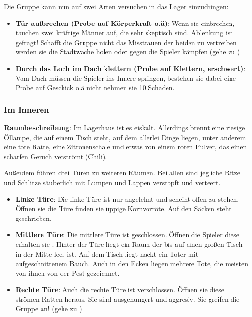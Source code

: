 Die Gruppe kann nun auf zwei Arten versuchen in das Lager einzudringen:

\begin{itemize}
  \item \textbf{Tür aufbrechen (Probe auf Körperkraft o.ä)}: Wenn sie einbrechen, tauchen zwei kräftige Männer auf, die sehr skeptisch sind. Ablenkung ist gefragt! Schafft die Gruppe nicht das Misstrauen der beiden zu vertreiben werden sie die Stadtwache holen oder gegen die Spieler kämpfen (gehe zu \blue{\ref{kampf2}})
  \item \textbf{Durch das Loch im Dach klettern (Probe auf Klettern, erschwert)}: Vom Dach müssen die Spieler ins Innere springen, bestehen sie dabei eine Probe auf Geschick o.ä nicht nehmen sie 10 Schaden.
\end{itemize}

\subsubsection{Im Inneren}

\textbf{Raumbeschreibung}: Im Lagerhaus ist es eiskalt. Allerdings brennt eine riesige Öllampe, die auf einem Tisch steht, auf dem allerlei Dinge liegen, unter anderem eine tote Ratte, eine Zitronenschale und etwas von einem roten Pulver, das einen scharfen Geruch verströmt (Chili).

Außerdem führen drei Türen zu weiteren Räumen. Bei allen sind jegliche Ritze und Schlitze säuberlich mit Lumpen und Lappen verstopft und verteert.

\begin{itemize}
  \item \textbf{Linke Türe}: Die linke Türe ist nur angelehnt und scheint offen zu stehen. Öffnen sie die Türe finden sie üppige Kornvorröte. Auf den Säcken steht  geschrieben.
  \item \textbf{Mittlere Türe}: Die mittlere Türe ist geschlossen. Öffnen die Spieler diese erhalten sie . Hinter der Türe liegt ein Raum der bis auf einen großen Tisch in der Mitte leer ist. Auf dem Tisch liegt nackt ein Toter mit aufgeschnittenem Bauch. Auch in den Ecken liegen mehrere Tote, die meisten von ihnen von der Pest gezeichnet.
  \item \textbf{Rechte Türe}: Auch die rechte Türe ist verschlossen. Öffnen sie diese strömen Ratten heraus. Sie sind ausgehungert und aggresiv. Sie greifen die Gruppe an! (gehe zu \blue{\ref{kampf3}})
\end{itemize}

